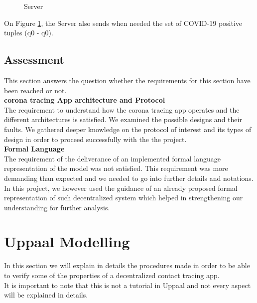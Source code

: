 \documentclass[a4paper, twocolumn]{article}
\begin{document}
\begin{figure}[H]
    \centering
    \caption{Server}
    \label{fig:server} 
\end{figure}
\noindent On Figure \ref{fig:server}, the Server also sends when needed the set of COVID-19 positive tuples (q0 - q0).

\subsection{Assessment}
This section answers the question whether the requirements for this section have been reached or not.\\

\noindent \textbf{corona tracing App architecture and Protocol}\\
The requirement to understand how the corona tracing app operates and the different architectures is satisfied. We examined the possible designs and their faults. We gathered deeper knowledge on the protocol of interest and its types of design in order to proceed successfully with the the project.\\

\noindent \textbf{Formal Language}\\
The requirement of the deliverance of an implemented formal language representation of the model was not satisfied. This requirement was more demanding than expected and we needed to go into further details and notations. In this project, we however used the guidance of an already proposed formal representation of such decentralized system which helped in strengthening our understanding for further analysis.

\section{ Uppaal Modelling}
In this section we will explain in details the procedures made in order to be able to verify some of the properties of a decentralized contact tracing app.\\
It is important to note that this is not a tutorial in Uppaal and not every aspect will be explained in details.
\label{sec-production}
\end{document}

